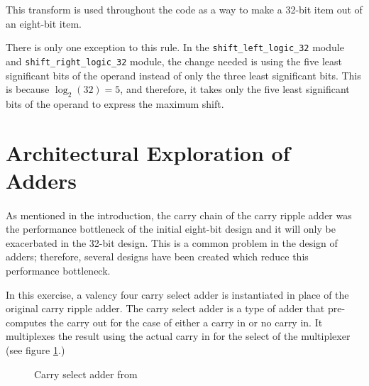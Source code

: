 \documentclass[11pt,letterpaper,final]{article}
\begin{document}
This transform is used throughout the code as a way to make a 32-bit item out of
an eight-bit item.  

There is only one exception to this rule.  In the \verb|shift_left_logic_32| module and 
\verb|shift_right_logic_32| module, the change needed is using the five least significant 
bits of the operand instead of only the three least significant bits.  This 
is because $ \log_{2}(32) = 5 $, and therefore, it takes only the five least significant
bits of the operand to express the maximum shift.

\section{ Architectural Exploration of Adders }
\label{Adders}
\paragraph{}
As mentioned in the introduction,  the carry chain of the carry ripple adder was 
the performance bottleneck of the initial eight-bit design and it will only be 
exacerbated in the 32-bit design.  This is a common problem in the design of 
adders; therefore, several designs have been created which reduce this 
performance bottleneck.  

In this exercise, a valency four carry select adder is instantiated in place of the 
original carry ripple adder.  The carry select adder is a type of adder that 
pre-computes the carry out for the case of either a carry in or no carry 
in.  It multiplexes the result using the actual carry in for the select of the 
multiplexer (see figure \ref{fig:carry_select}.)  

\begin{figure}[ht]
  \centering
  \caption{Carry select adder from \cite{cmosvlsi}}
  \label{fig:carry_select}
\end{figure}
\end{document}
